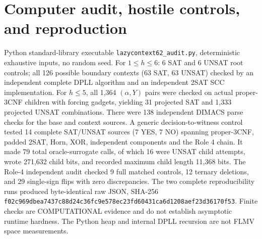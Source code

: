 \documentclass[11pt]{article}
\begin{document}
\section{Computer audit, hostile controls, and reproduction}
Python standard-library executable \texttt{lazycontext62\_audit.py}, deterministic exhaustive inputs, no random seed. For $1\le h\le6$: 6 SAT and 6 UNSAT root controls; all 126 possible boundary contexts (63 SAT, 63 UNSAT) checked by an independent complete DPLL algorithm and an independent 2SAT SCC implementation. For $h\le5$, all 1,364 $(\alpha,Y)$ pairs were checked on actual proper-3CNF children with forcing gadgets, yielding 31 projected SAT and 1,333 projected UNSAT combinations. There were 138 independent DIMACS parse checks for the base and context sources. A generic decision-to-witness control tested 14 complete SAT/UNSAT sources (7 YES, 7 NO) spanning proper-3CNF, padded 2SAT, Horn, XOR, independent components and the Role 4 chain. It made 79 total oracle-surrogate calls, of which 16 were UNSAT child attempts, wrote 271,632 child bits, and recorded maximum child length 11,368 bits. The Role-4 independent audit checked 9 full matched controls, 12 ternary deletions, and 29 single-sign flips with zero discrepancies. The two complete reproducibility runs produced byte-identical raw JSON, SHA-256
\texttt{f02c969dbea7437c88d24c36fc9e578ec23fd60431ca6d1208aef23d36170f53}.
Finite checks are COMPUTATIONAL evidence and do not establish asymptotic runtime hardness. The Python heap and internal DPLL recursion are not FLMV space measurements.
\end{document}

